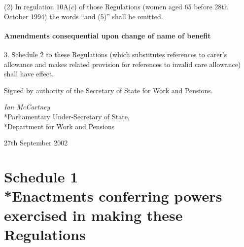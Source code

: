 \documentclass[12pt,a4paper]{article}
\begin{document}
(2) In regulation 10A($c$)  of those Regulations (women aged 65 before 28th October 1994) the words “and (5)” shall be omitted.

\subsection[3. Amendments consequential upon change of name of benefit]{Amendments consequential upon change of name of benefit}

3.  Schedule 2 to these Regulations (which substitutes references to carer’s allowance and makes related provision for references to invalid care allowance) shall have effect. 

\bigskip

Signed 
by authority of the 
Secretary of State for Work and Pensions.

{\raggedleft
\emph{Ian McCartney}\\*Parliamentary Under-Secretary of State,\\*Department for Work and Pensions

}

27th September 2002

\small

\part[Schedule 1 --- Enactments conferring powers exercised in making these Regulations]{Schedule 1\\*Enactments conferring powers exercised in making these Regulations}
\end{document}
